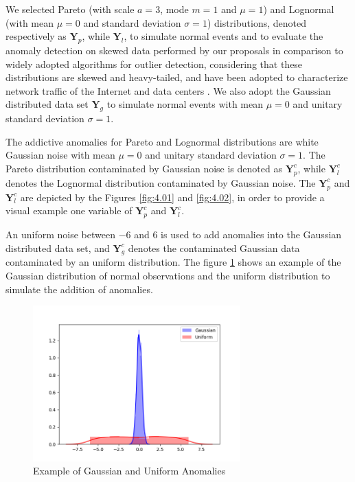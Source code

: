 We selected Pareto (with scale $a=3$, mode $m=1$ and $\mu=1$) and Lognormal (with mean $\mu=0$ and standard deviation $\sigma=1$) distributions, denoted respectively as $\pmb{Y}_p$, while $\pmb{Y}_l$, to simulate normal events and to evaluate the anomaly detection on skewed data performed by our proposals in comparison to widely adopted algorithms for outlier detection, considering that these distributions are skewed and heavy-tailed, and have been adopted to characterize network traffic of the Internet and data centers \cite{benson2010network,leon2017probability}. We also adopt the Gaussian distributed data set $\pmb{Y}_g$ to simulate normal events with mean $\mu=0$ and unitary standard deviation $\sigma=1$.

The addictive anomalies for Pareto and Lognormal distributions are white Gaussian noise with mean $\mu=0$ and unitary standard deviation $\sigma=1$. The Pareto distribution contaminated by Gaussian noise is denoted as $\pmb{Y}_p^c$, while $\pmb{Y}_l^c$ denotes the Lognormal distribution contaminated by Gaussian noise. The $\pmb{Y}_p^c$ and $\pmb{Y}_l^c$ are depicted by the Figures \ref{fig:4.01} and \ref{fig:4.02}, in order to provide a visual example one variable of $\pmb{Y}_p^c$ and $\pmb{Y}_l^c$.

\begin{figure}[!htb]
\end{figure}

An uniform noise between $-6$ and $6$ is used to add anomalies into the Gaussian distributed data set, and $\pmb{Y}_g^c$ denotes the contaminated Gaussian data contaminated by an uniform distribution. The figure \ref{fig:4.04} shows an example of the Gaussian distribution of normal observations and the uniform distribution to simulate the addition of anomalies.

\begin{figure}[h!]
	\centering
	\includegraphics[width=8cm]{figs/ch4/4_Xgu2.png}
	\caption{Example of Gaussian and Uniform Anomalies}
	\label{fig:4.04}
\end{figure}

